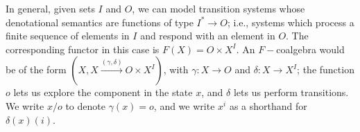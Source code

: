 In general, given sets $I$ and $O$, we can model transition systems whose denotational semantics are functions of type $I^*\rightarrow O$; i.e., systems which process a finite sequence of elements in $I$ and respond with an element in $O$. The corresponding functor in this case is $F(X)=O\times X^I$. An $F-$coalgebra would be of the form $(X,X\xrightarrow{(\gamma,\delta)}O\times X^I)$, with $\gamma\colon X\rightarrow O$ and $\delta\colon X\rightarrow X^I$; the function $o$ lets us explore the component in the state $x$, and $\delta$ lets us perform transitions. We write $x/o$ to denote $\gamma(x)=o$, and we write $x^i$ as a shorthand for $\delta(x)(i)$. 

%
